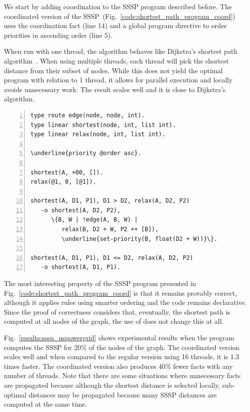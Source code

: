 We start by adding coordination to the SSSP program described before.
The coordinated version of the
SSSP~(Fig.~\ref{code:shortest_path_program_coord}) uses the coordination fact
 (line 14) and a global program directive to order
priorities in ascending order (line 5).

When run with one thread, the algorithm behaves like
Dijkstra's shortest path algorithm~\cite{Dijkstra}. When using multiple
threads, each thread will pick the shortest distance from their subset of nodes.
While this does not yield the optimal program with relation to 1 thread, it
allows for parallel execution and locally avoids unnecessary work. The result
scales well and it is close to Dijkstra's algorithm.

\begin{topfig}
\scriptsize\begin{Verbatim}[numbers=left,xleftmargin=7mm,commandchars=\\\{\}]
type route edge(node, node, int).
type linear shortest(node, int, list int).
type linear relax(node, int, list int).

\underline{priority @order asc}.

shortest(A, +00, []).
relax(@1, 0, [@1]).

shortest(A, D1, P1), D1 > D2, relax(A, D2, P2)
   -o shortest(A, D2, P2),
      \{B, W | !edge(A, B, W) |
         relax(B, D2 + W, P2 ++ [B]),
         \underline{set-priority(B, float(D2 + W))}\}.

shortest(A, D1, P1), D1 <= D2, relax(A, D2, P2)
   -o shortest(A, D1, P1).
\end{Verbatim}
\end{topfig}
\normalsize

The most interesting property of the SSSP program presented in
Fig.~\ref{code:shortest_path_program_coord} is that it remains provably correct,
although it applies rules using smarter ordering and the code remains
declarative. Since the proof of correctness considers that, eventually, the shortest
path is computed at all nodes of the graph, the use of 
does not change this at all.

Fig.~\ref{results:sssp_uspowergrid} shows experimental results when
the program computes the SSSP for 20\% of the nodes of the graph.  The
coordinated version scales well and when compared to the regular version
using 16 threads, it is 1.3 times faster. The coordinated version
also produces 40\% fewer facts with any number of threads.
Note that there are some situations where unnecessary facts are
propagated because although the shortest distance is selected locally,
sub-optimal distances may be propagated because many SSSP distances
are computed at the same time.


